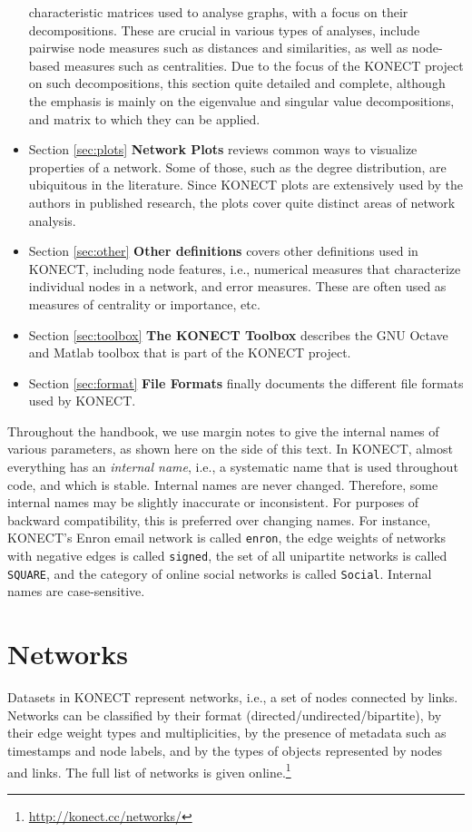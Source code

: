 \documentclass{article}
\begin{document}
\begin{itemize}
  characteristic matrices used to analyse graphs, with a focus on their
  decompositions.  These are crucial in various types of analyses,
  include pairwise node measures such as distances and similarities, as
  well as node-based measures such as centralities.  Due to the focus of
  the KONECT project on such decompositions, this section quite detailed
  and complete, although the emphasis is mainly on the eigenvalue and
  singular value decompositions, and matrix to which they can be
  applied. 
\item Section \ref{sec:plots} \textbf{Network Plots} reviews common ways to
  visualize properties of a network.  Some of those, such as the degree
  distribution, are ubiquitous in the literature.  Since KONECT plots
  are extensively used by the authors in published research, the plots
  cover quite distinct areas of network analysis. 
\item Section \ref{sec:other} \textbf{Other definitions} covers other
  definitions used in KONECT, including node features,
  i.e., numerical measures that characterize individual nodes in a
  network, and error measures.  These are often used as measures of centrality or
  importance, etc. 
\item Section \ref{sec:toolbox} \textbf{The KONECT Toolbox} describes the GNU
  Octave and Matlab toolbox that is part of the KONECT project. 
\item Section \ref{sec:format} \textbf{File Formats} finally documents the
  different file formats used by KONECT. 
\end{itemize}
Throughout the handbook, we use margin notes to give the internal 
names of various parameters, as shown here on the side of this text.  
In KONECT, almost everything has an \emph{internal name}, i.e., a
systematic name that is used throughout code, and which is stable.
Internal names are never changed.  Therefore, some internal names may be
slightly inaccurate or inconsistent.  For purposes of backward
compatibility, this is preferred over changing names.  For instance,
KONECT's Enron email network is called \texttt{enron}, the edge weights
of networks with negative edges is called \texttt{signed}, the set
of all unipartite networks is called \texttt{SQUARE}, and the category
of online social networks is called \texttt{Social}.  Internal names are
case-sensitive. 

\section{Networks}
\label{sec:taxonomy}
Datasets in KONECT represent networks, i.e., a set of nodes connected by
links. Networks can be classified by their format
(directed/undirected/bipartite), by their edge weight types and
multiplicities, by the 
presence of metadata such as timestamps and node labels, and by
the types of objects represented by nodes and links. 
The full list of networks is given
online.\footnote{\href{http://konect.cc/networks/}{http://konect.cc/networks/}}  
\end{document}
